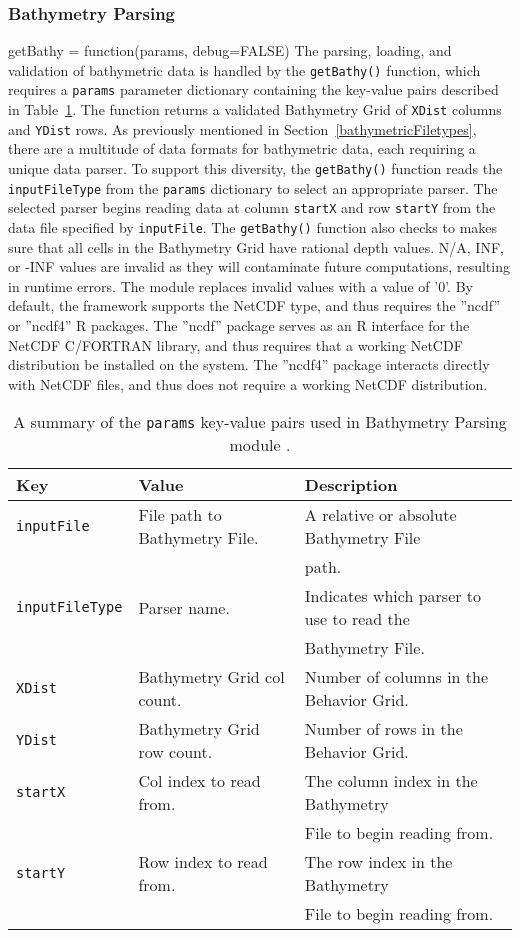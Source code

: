 \subsubsection{Bathymetry Parsing}
getBathy = function(params, debug=FALSE) 
The parsing, loading, and validation of bathymetric data is handled by the \texttt{getBathy()} function, which requires a \texttt{params} parameter dictionary containing the key-value pairs described in Table~\ref{bathyParams}.  The function returns a validated Bathymetry Grid of \texttt{XDist} columns and \texttt{YDist} rows.  As previously mentioned in Section~\ref{bathymetricFiletypes}, there are a multitude of data formats for bathymetric data, each requiring a unique data parser.  To support this diversity, the \texttt{getBathy()} function reads the \texttt{inputFileType} from the \texttt{params} dictionary to select an appropriate parser.  The selected parser begins reading data at column \texttt{startX} and row \texttt{startY} from the data file specified by \texttt{inputFile}.  The \texttt{getBathy()} function also checks to makes sure that all cells in the Bathymetry Grid have rational depth values.  N/A, INF, or -INF values are invalid as they will contaminate future computations, resulting in runtime errors.  The module replaces invalid values with a value of '0'.  By default, the framework supports the NetCDF type, and thus requires the ''ncdf'' or ''ncdf4'' R packages.  The ''ncdf'' package serves as an R interface for the NetCDF C/FORTRAN library, and thus requires that a working NetCDF distribution be installed on the system.  The ''ncdf4'' package interacts directly with NetCDF files, and thus does not require a working NetCDF distribution.  

\begin{table}[ht]
	\begin{tabular}{l l l}
		Key						&	Value 								&	Description\\
		\hline
		\texttt{inputFile}		& 	File path to Bathymetry File.		&	A relative or absolute Bathymetry File\\
								&										&	path.\\
		\texttt{inputFileType}	& 	Parser name.						&	Indicates which parser to use to read the \\
								&										&	Bathymetry File.\\
		\texttt{XDist}			&	Bathymetry Grid col count.			&	Number of columns in the Behavior Grid.\\
		\texttt{YDist}			&	Bathymetry Grid row count.			&	Number of rows in the Behavior 	Grid.\\		
		\texttt{startX}			& 	Col index to read from. 			& 	The column index in the Bathymetry\\
								&										&   File to	begin reading from.\\
		\texttt{startY}			& 	Row index to read from.				&	The row index in the Bathymetry\\
								&										&	File to begin reading from.\\
	\end{tabular}
	\caption{A summary of the \texttt{params} key-value pairs used in Bathymetry Parsing module .
		\label{bathyParams}}
\end{table}

